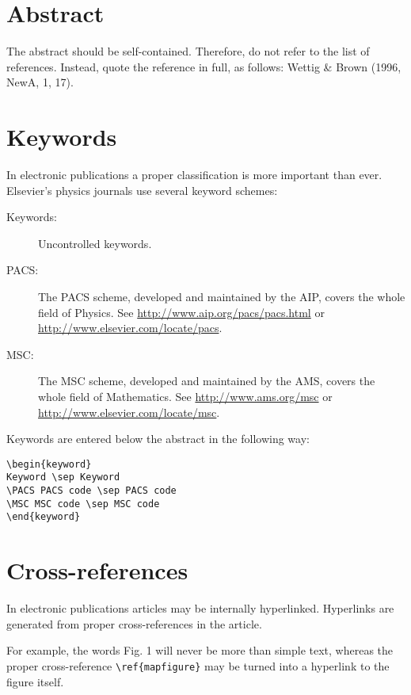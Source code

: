\documentclass{elsart}
\begin{document}

\section{Abstract}

The abstract should be self-contained. Therefore, do not refer to the
list of references. Instead, quote the reference in full, as follows:
Wettig \& Brown (1996, NewA, 1, 17).

\section{Keywords}
\label{keywd}
\enlargethispage*{2.5pc}

In electronic publications a proper classification is more important
than ever. Elsevier's physics journals use several keyword
schemes:\ 

\begin{description}
\item[Keywords:] Uncontrolled keywords.
\item[PACS:] The PACS scheme, developed and maintained by the AIP,
covers the whole field of Physics.
See \url{http://www.aip.org/pacs/pacs.html}
or \url{http://www.elsevier.com/locate/pacs}.
\item[MSC:] The MSC scheme, developed and maintained by the AMS,
covers the whole field of Mathematics.
See \url{http://www.ams.org/msc}
or \url{http://www.elsevier.com/locate/msc}.
\end{description}

Keywords are entered below the abstract in the following way:
\pagebreak[4]
\begin{verbatim}
\begin{keyword}
Keyword \sep Keyword
\PACS PACS code \sep PACS code
\MSC MSC code \sep MSC code
\end{keyword}
\end{verbatim}

\section{Cross-references}
\label{xrefs}

In electronic publications articles may be internally hyperlinked.
Hyperlinks are generated from proper cross-references in the article.

For example, the words Fig. 1 will never be more than simple text,
whereas the proper cross-reference \verb|\ref{mapfigure}| may be
turned into a hyperlink to the figure itself.
\end{document}
